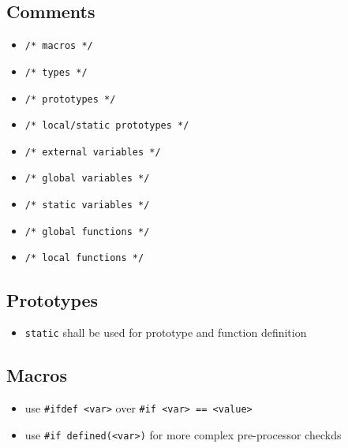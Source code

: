 \subsection{Comments}
	\begin{itemize}
		\item \lstinline{/* macros */}
		\item \lstinline{/* types */}
		\item \lstinline{/* prototypes */}
		\item \lstinline{/* local/static prototypes */}
		\item \lstinline{/* external variables */}
		\item \lstinline{/* global variables */}
		\item \lstinline{/* static variables */}
		\item \lstinline{/* global functions */}
		\item \lstinline{/* local functions */}
	\end{itemize}
	
\subsection{Prototypes}
	\begin{itemize}
		\item \lstinline{static} shall be used for prototype and function definition
	\end{itemize}

\subsection{Macros}
	\begin{itemize}
		\item use \lstinline{#ifdef <var>} over \lstinline{#if <var> == <value>}
		\item use \lstinline{#if defined(<var>)} for more complex pre-processor checkds
	\end{itemize}
